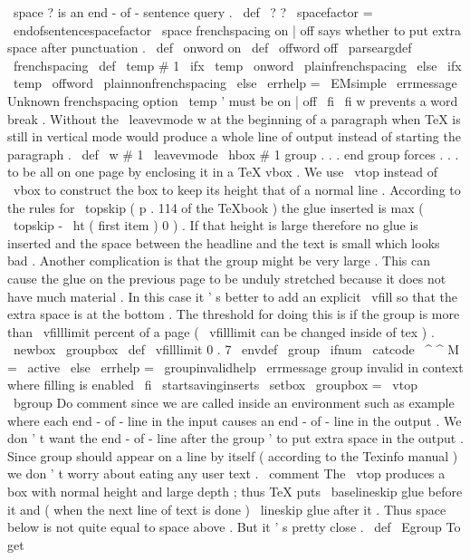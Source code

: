 {{\
space
}
%
?
is
an
end
-
of
-
sentence
query
.
\
def
\
?
{
?
\
spacefactor
=
\
endofsentencespacefactor
\
space
}
%
frenchspacing
on
|
off
says
whether
to
put
extra
space
after
punctuation
.
%
\
def
\
onword
{
on
}
\
def
\
offword
{
off
}
%
\
parseargdef
\
frenchspacing
{
%
\
def
\
temp
{
#
1
}
%
\
ifx
\
temp
\
onword
\
plainfrenchspacing
\
else
\
ifx
\
temp
\
offword
\
plainnonfrenchspacing
\
else
\
errhelp
=
\
EMsimple
\
errmessage
{
Unknown
frenchspacing
option
\
temp
'
must
be
on
|
off
}
%
\
fi
\
fi
}
%
w
prevents
a
word
break
.
Without
the
\
leavevmode
w
at
the
%
beginning
of
a
paragraph
when
TeX
is
still
in
vertical
mode
would
%
produce
a
whole
line
of
output
instead
of
starting
the
paragraph
.
\
def
\
w
#
1
{
\
leavevmode
\
hbox
{
#
1
}
}
%
group
.
.
.
end
group
forces
.
.
.
to
be
all
on
one
page
by
enclosing
%
it
in
a
TeX
vbox
.
We
use
\
vtop
instead
of
\
vbox
to
construct
the
box
%
to
keep
its
height
that
of
a
normal
line
.
According
to
the
rules
for
%
\
topskip
(
p
.
114
of
the
TeXbook
)
the
glue
inserted
is
%
max
(
\
topskip
-
\
ht
(
first
item
)
0
)
.
If
that
height
is
large
%
therefore
no
glue
is
inserted
and
the
space
between
the
headline
and
%
the
text
is
small
which
looks
bad
.
%
%
Another
complication
is
that
the
group
might
be
very
large
.
This
can
%
cause
the
glue
on
the
previous
page
to
be
unduly
stretched
because
it
%
does
not
have
much
material
.
In
this
case
it
'
s
better
to
add
an
%
explicit
\
vfill
so
that
the
extra
space
is
at
the
bottom
.
The
%
threshold
for
doing
this
is
if
the
group
is
more
than
\
vfilllimit
%
percent
of
a
page
(
\
vfilllimit
can
be
changed
inside
of
tex
)
.
%
\
newbox
\
groupbox
\
def
\
vfilllimit
{
0
.
7
}
%
\
envdef
\
group
{
%
\
ifnum
\
catcode
\
^
^
M
=
\
active
\
else
\
errhelp
=
\
groupinvalidhelp
\
errmessage
{
group
invalid
in
context
where
filling
is
enabled
}
%
\
fi
\
startsavinginserts
%
\
setbox
\
groupbox
=
\
vtop
\
bgroup
%
Do
comment
since
we
are
called
inside
an
environment
such
as
%
example
where
each
end
-
of
-
line
in
the
input
causes
an
%
end
-
of
-
line
in
the
output
.
We
don
'
t
want
the
end
-
of
-
line
after
%
the
group
'
to
put
extra
space
in
the
output
.
Since
group
%
should
appear
on
a
line
by
itself
(
according
to
the
Texinfo
%
manual
)
we
don
'
t
worry
about
eating
any
user
text
.
\
comment
}
%
%
The
\
vtop
produces
a
box
with
normal
height
and
large
depth
;
thus
TeX
puts
%
\
baselineskip
glue
before
it
and
(
when
the
next
line
of
text
is
done
)
%
\
lineskip
glue
after
it
.
Thus
space
below
is
not
quite
equal
to
space
%
above
.
But
it
'
s
pretty
close
.
\
def
\
Egroup
{
%
%
To
get
}}
